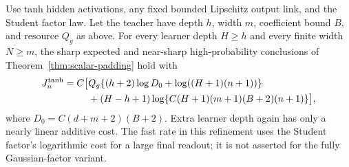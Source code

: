 \begin{theorem}\label{thm:tanh-padding}
Use tanh hidden activations, any fixed bounded Lipschitz output link, and the Student factor law. Let the teacher have depth $h$, width $m$, coefficient bound $B$, and resource $Q_g$ as above. For every learner depth $H\ge h$ and every finite width $N\ge m$, the sharp expected and near-sharp high-probability conclusions of Theorem~\ref{thm:scalar-padding} hold with
\begin{align}
 J_n^{\tanh}=C\big[&Q_g\{(h+2)\log D_0+
                       \log((H+1)(n+1))\}\notag\\
 &+(H-h+1)\log\{C(H+1)(m+1)(B+2)(n+1)\}\big],
 \label{eq:tanh-padding-cost}
\end{align}
where $D_0=C(d+m+2)(B+2)$. Extra learner depth again has only a nearly linear additive cost. The fast rate in this refinement uses the Student factor's logarithmic cost for a large final readout; it is not asserted for the fully Gaussian-factor variant.
\end{theorem}
